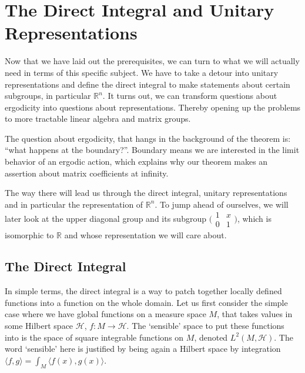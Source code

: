 \documentclass[
  12pt
]{article}
\theoremstyle{break}
\theoremstyle{plain}
\newcommand{\bbr}{\ensuremath{\mathbb{R}}\xspace}
\newcommand{\ipmatrix}[1]{%
\ensuremath{\big(\begin{smallmatrix} #1 \end{smallmatrix}\big)}\xspace}
\begin{document}


\hypertarget{the-direct-integral-and-unitary-representations}{%
\section{The Direct Integral and Unitary Representations}\label{the-direct-integral-and-unitary-representations}}


  Now that we have laid out the prerequisites, we can turn to what we will actually need in terms of this specific subject.
  We have to take a detour into unitary
  representations and define the direct integral to make statements about
  certain subgroups, in particular $\bbr^n$.
  It turns out, we can transform questions about ergodicity into questions about representations.
  Thereby opening up the problems to more tractable linear algebra and matrix groups.

  The question about ergodicity, that hangs in the background of the theorem is:
  ``what happens at the boundary?''. Boundary means we are interested in the limit behavior of an ergodic action, which explains why our theorem makes an assertion about matrix coefficients at infinity.

  The way there will lead us through the direct integral, unitary representations
  and in particular the representation of $\mathbb{R}^n$. To jump ahead of
  ourselves, we will later look at the upper diagonal group and its subgroup
  \ipmatrix{1 & x \\ 0 & 1}, which is isomorphic to $\mathbb{R}$ and whose
  representation we will care about.

  \hypertarget{the-direct-integral}{%
  \subsection{The Direct Integral}\label{the-direct-integral}}

  In simple terms, the direct integral is a way to patch together locally
  defined functions into a function on the whole domain. Let us first
  consider the simple case where we have global functions on a measure
  space $M$, that takes values in some Hilbert space $\mathscr{H}$,
  $f:M \rightarrow \mathscr{H}$. The `sensible' space to put these
  functions into is the space of square integrable functions on $M$,
  denoted $L^2(M, \mathscr{H})$. The word `sensible' here is justified
  by being again a Hilbert space by integration
  $\langle f, g\rangle = \int_M\langle f(x), g(x)\rangle$.
\end{document}
